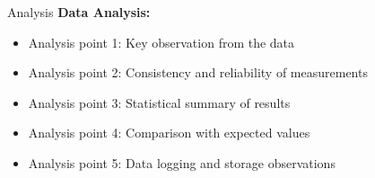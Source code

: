 
\begin{frame}{Analysis}
    \textbf{Data Analysis:}
    \begin{itemize}
        \item Analysis point 1: Key observation from the data
        \item Analysis point 2: Consistency and reliability of measurements
        \item Analysis point 3: Statistical summary of results
        \item Analysis point 4: Comparison with expected values
        \item Analysis point 5: Data logging and storage observations
    \end{itemize}
\end{frame}
